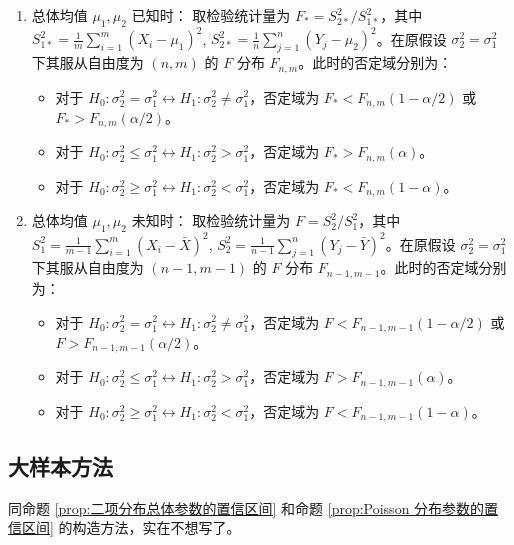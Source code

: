 \begin{proposition}[两个正态总体方差比的假设检验]\label{prop:two_normal_variance_ratio_hypothesis_test}
    \begin{enumerate}
        \item 总体均值 $\mu_1, \mu_2$ 已知时：
        取检验统计量为 $F_* = S_{2*}^2/S_{1*}^2$，其中 $S_{1*}^2 = \frac{1}{m}\sum_{i=1}^m (X_i - \mu_1)^2$, $S_{2*}^2 = \frac{1}{n}\sum_{j=1}^n (Y_j - \mu_2)^2$。在原假设 $\sigma_2^2=\sigma_1^2$ 下其服从自由度为 $(n,m)$ 的 $F$ 分布 $F_{n,m}$。此时的否定域分别为：
        \begin{itemize}
            \item 对于 $H_0: \sigma_2^2 = \sigma_1^2 \leftrightarrow H_1: \sigma_2^2 \ne \sigma_1^2$，否定域为 $F_* < F_{n,m}(1-\alpha/2)$ 或 $F_* > F_{n,m}(\alpha/2)$。
            \item 对于 $H_0: \sigma_2^2 \le \sigma_1^2 \leftrightarrow H_1: \sigma_2^2 > \sigma_1^2$，否定域为 $F_* > F_{n,m}(\alpha)$。
            \item 对于 $H_0: \sigma_2^2 \ge \sigma_1^2 \leftrightarrow H_1: \sigma_2^2 < \sigma_1^2$，否定域为 $F_* < F_{n,m}(1-\alpha)$。
        \end{itemize}
        \item 总体均值 $\mu_1, \mu_2$ 未知时：
        取检验统计量为 $F = S_2^2/S_1^2$，其中 $S_1^2 = \frac{1}{m-1}\sum_{i=1}^m (X_i - \bar{X})^2$, $S_2^2 = \frac{1}{n-1}\sum_{j=1}^n (Y_j - \bar{Y})^2$。在原假设 $\sigma_2^2=\sigma_1^2$ 下其服从自由度为 $(n-1,m-1)$ 的 $F$ 分布 $F_{n-1,m-1}$。此时的否定域分别为：
        \begin{itemize}
            \item 对于 $H_0: \sigma_2^2 = \sigma_1^2 \leftrightarrow H_1: \sigma_2^2 \ne \sigma_1^2$，否定域为 $F < F_{n-1,m-1}(1-\alpha/2)$ 或 $F > F_{n-1,m-1}(\alpha/2)$。
            \item 对于 $H_0: \sigma_2^2 \le \sigma_1^2 \leftrightarrow H_1: \sigma_2^2 > \sigma_1^2$，否定域为 $F > F_{n-1,m-1}(\alpha)$。
            \item 对于 $H_0: \sigma_2^2 \ge \sigma_1^2 \leftrightarrow H_1: \sigma_2^2 < \sigma_1^2$，否定域为 $F < F_{n-1,m-1}(1-\alpha)$。
        \end{itemize}
    \end{enumerate}
\end{proposition}

\subsection{大样本方法}\label{subsec:大样本方法}
同命题 \ref{prop:二项分布总体参数的置信区间} 和命题 \ref{prop:Poisson 分布参数的置信区间} 的构造方法，实在不想写了。


